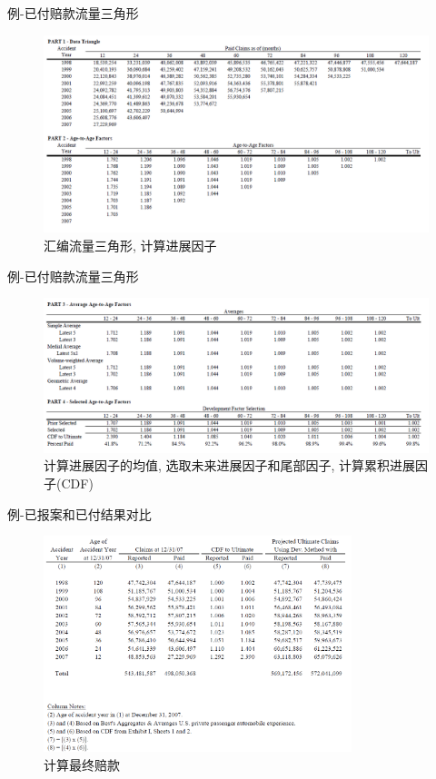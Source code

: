 \documentclass[professionalfont]{beamer}
\begin{document}
\begin{frame}{例-已付赔款流量三角形}
	\begin{figure}
		\includegraphics[width=1\textwidth]{Plots/CL3.jpg}
		\caption{汇编流量三角形, 计算进展因子}
	\end{figure}
\end{frame}
\begin{frame}{例-已付赔款流量三角形}
	\begin{figure}
		\includegraphics[width=1\textwidth]{Plots/CL4.jpg}
		\caption{计算进展因子的均值, 选取未来进展因子和尾部因子, 计算累积进展因子(CDF)}
	\end{figure}
\end{frame}
\begin{frame}{例-已报案和已付结果对比}
	\begin{figure}
		\includegraphics[width=0.8\textwidth]{Plots/CL5.jpg}
		\caption{计算最终赔款}
	\end{figure}
\end{frame}
\end{document}
